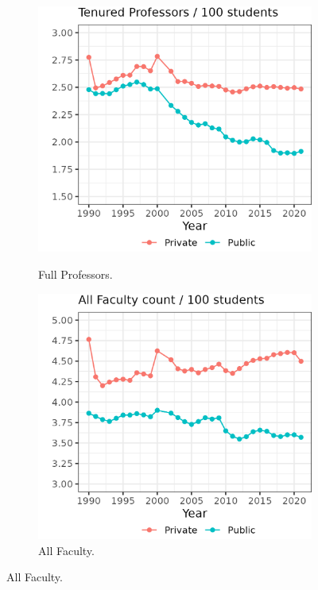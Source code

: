 \begin{figure}[H]
\begin{subfigure}[b]{0.495\textwidth}
        \label{fig:assistant-fte-perprof}
    \end{subfigure}
    \begin{subfigure}[b]{0.495\textwidth}
        \centering
        \caption{Full Professors.}
        \includegraphics[width=\textwidth]{figures/full-fte-perprof.png}
        \label{fig:full-fte-perprof}
    \end{subfigure}
    \begin{subfigure}[b]{0.495\textwidth}
        \centering
        \caption{All Faculty.}
        \includegraphics[width=\textwidth]{figures/all-fte-perprof.png}

\end{subfigure}
\end{figure}
